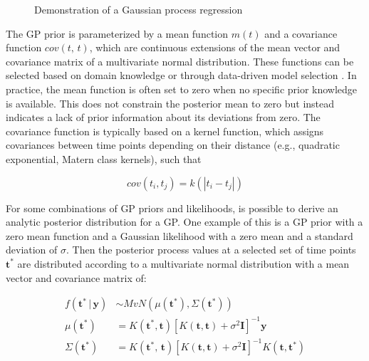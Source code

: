 \documentclass[man, floatsintext]{apa7}
\begin{document}
\begin{figure}[!t]
  \caption{Demonstration of a Gaussian process regression}
  \label{fig:gp_dem}
\end{figure}

The GP prior is parameterized by a mean function $m(t)$ and a covariance
function $cov(t, \, t)$, which are continuous extensions of the mean vector and
covariance matrix of a multivariate normal distribution. These functions can be
selected based on domain knowledge or through data-driven model selection
\parencite{richardson_gaussian_2017, abdessalem_automatic_2017}. In practice,
the mean function is often set to zero when no specific prior knowledge is
available. This does not constrain the posterior mean to zero but instead
indicates a lack of prior information about its deviations from zero. The
covariance function is typically based on a kernel function, which assigns
covariances between time points depending on their distance (e.g.,
quadratic exponential, Matern class kernels), such that

\begin{equation}
  cov(t_i, t_j) = k(|t_i - t_j|)
\end{equation}

For some combinations of GP priors and likelihoods, is possible to derive an
analytic posterior distribution for a GP\@. One example of this is a GP prior
with a zero mean function and a Gaussian likelihood with a zero mean and a
standard deviation of $\sigma$. Then the posterior process values at a selected
set of time points $\textbf{t}^*$ are distributed according to a multivariate
normal distribution with a mean vector and covariance matrix of:

\begin{equation}
  \begin{aligned}
    f(\textbf{t}^* \, | \, \textbf{y}) & \sim MvN(\mu(\textbf{t}^*),
    \Sigma(\textbf{t}^*))
    \\
    \mu(\textbf{t}^*)                  & = K(\textbf{t}^*,
    \textbf{t}){[K(\textbf{t},
            \textbf{t}) + \sigma^2
            \textbf{I}]}^{-1}\textbf{y}
    \\
    \Sigma(\textbf{t}^*)               & =K(\textbf{t}^*, \,
    \textbf{t}){[K(\textbf{t},
            \textbf{t}) + \sigma^2
            \textbf{I}]}^{-1} K(\textbf{t}, \textbf{t}^*)
  \end{aligned}
\end{equation}
\end{document}

